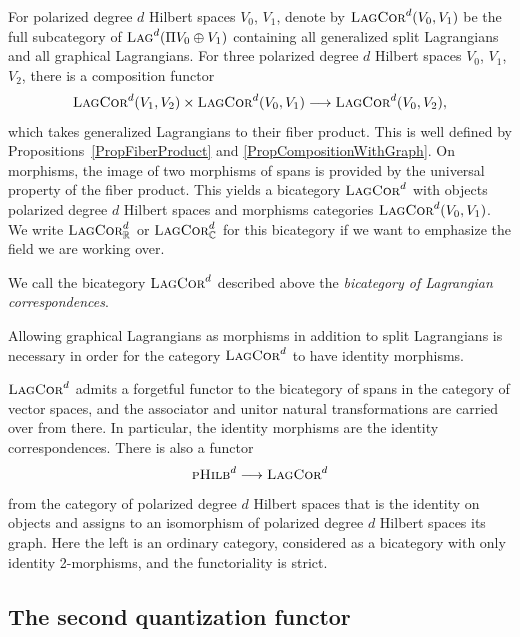 \documentclass[pdftex]{sigma}
\numberwithin{equation}{section}
\newcommand{\Lag}{\textsc{Lag}}
\newcommand{\LagCor}{\textsc{LagCor}}
\newcommand{\pHilb}{\textsc{pHilb}}
\newcommand{\R}{\mathbb{R}}
\newcommand{\C}{\mathbb{C}}
\begin{document}
For polarized degree $d$ Hilbert spaces $V_0$, $V_1$, denote by $\LagCor^d(V_0, V_1)$ be the full subcategory of $\Lag^d(\Pi V_0 \oplus V_1)$ containing all generalized split Lagrangians and all graphical Lagrangians.
For three polarized degree $d$ Hilbert spaces $V_0$, $V_1$, $V_2$, there is a composition functor
\begin{equation*}
 \LagCor^d(V_1, V_2) \times \LagCor^d(V_0, V_1) \longrightarrow \LagCor^d(V_0, V_2),
\end{equation*}
which takes generalized Lagrangians to their fiber product.
This is well defined by Propositions~\ref{PropFiberProduct} and \ref{PropCompositionWithGraph}.
On morphisms, the image of two morphisms of spans is provided by the universal property of the fiber product.
This yields a bicategory $\LagCor^d$ with objects polarized degree $d$ Hilbert spaces and morphisms categories $\LagCor^d(V_0, V_1)$.
We write $\LagCor^d_\R$ or $\LagCor^d_\C$ for this bicategory if we want to emphasize the field we are working over.

\begin{Definition}
 We call the bicategory $\LagCor^d$ described above the \emph{bicategory of Lagrangian correspondences}.
\end{Definition}

\begin{Remark}
Allowing graphical Lagrangians as morphisms in addition to split Lagrangians is necessary in order for the category $\LagCor^d$ to have identity morphisms.
\end{Remark}

$\LagCor^d$ admits a forgetful functor to the bicategory of spans in the category of vector spaces, and the associator and unitor natural transformations are carried over from there.
In particular, the identity morphisms are the identity correspondences.
There is also a functor
\begin{equation*}
 \pHilb^d \longrightarrow \LagCor^d
\end{equation*}
from the category of polarized degree $d$ Hilbert spaces that is the identity on objects and assigns to an isomorphism of polarized degree $d$ Hilbert spaces its graph.
Here the left is an ordinary category, considered as a bicategory with only identity 2-morphisms, and the functoriality is strict.



\subsection{The second quantization functor}
\label{SectionSecondQuantization}
\end{document}
